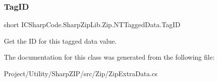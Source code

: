 \subsubsection{\texorpdfstring{Tag\+ID}{TagID}}
{\footnotesize\ttfamily short I\+C\+Sharp\+Code.\+Sharp\+Zip\+Lib.\+Zip.\+N\+T\+Tagged\+Data.\+Tag\+ID\hspace{0.3cm}{\ttfamily [get]}}



Get the ID for this tagged data value. 



The documentation for this class was generated from the following file\+:\begin{DoxyCompactItemize}
\item 
Project/\+Utility/\+Sharp\+Z\+I\+P/src/\+Zip/Zip\+Extra\+Data.\+cs\end{DoxyCompactItemize}
